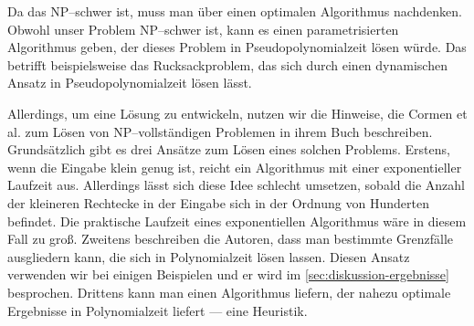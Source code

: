 Da das \fp{} NP--schwer ist, muss man über einen optimalen Algorithmus nachdenken. 
Obwohl unser Problem NP--schwer ist, kann es einen parametrisierten Algorithmus geben,
der dieses Problem in Pseudopolynomialzeit lösen würde.
Das betrifft beispielsweise das Rucksackproblem, das sich durch einen dynamischen 
Ansatz in Pseudopolynomialzeit lösen lässt.\cite{parametrized}

Allerdings, um eine Lösung zu entwickeln, nutzen wir die Hinweise, die Cormen et al. zum Lösen von NP--vollständigen Problemen
in ihrem Buch beschreiben. Grundsätzlich gibt es drei Ansätze zum Lösen eines
solchen Problems.\cite[S.~1106]{cormen}
Erstens, wenn die Eingabe klein genug ist, reicht ein 
Algorithmus mit einer exponentieller Laufzeit aus.
Allerdings lässt sich diese Idee schlecht umsetzen,
sobald die Anzahl der kleineren Rechtecke in der Eingabe sich in der Ordnung von Hunderten befindet.
Die praktische Laufzeit eines exponentiellen Algorithmus wäre in diesem Fall zu groß.
Zweitens beschreiben die Autoren,
dass man bestimmte Grenzfälle ausgliedern kann, die sich in Polynomialzeit lösen lassen.
Diesen Ansatz verwenden wir bei einigen Beispielen und er wird im \cref{sec:diskussion-ergebnisse}
besprochen.
Drittens kann man einen Algorithmus liefern, der nahezu optimale Ergebnisse 
in Polynomialzeit liefert --- eine Heuristik. 



